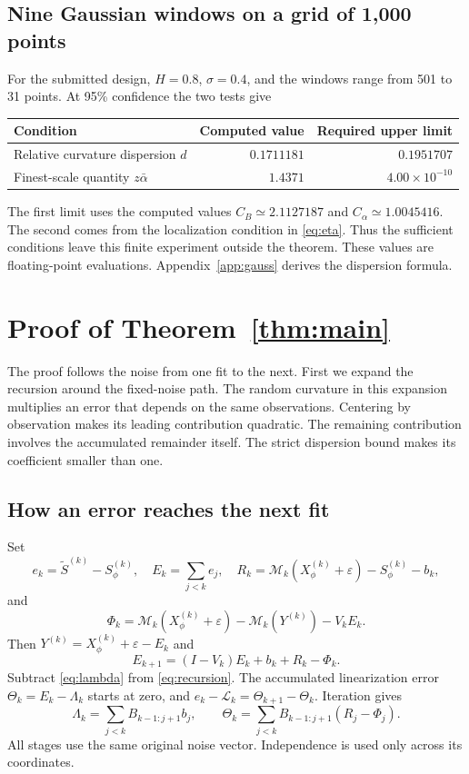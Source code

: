 \documentclass[11pt]{article}
\theoremstyle{remark}
\begin{document}
\subsection{Nine Gaussian windows on a grid of 1,000 points}
For the submitted design, \(H=0.8\), \(\sigma=0.4\), and the windows
range from 501 to 31 points. At 95\% confidence the two tests give
\begin{center}
\begin{tabular}{lrr}
\toprule
Condition & Computed value & Required upper limit\\
\midrule
Relative curvature dispersion \(d\) & \(0.1711181\) & \(0.1951707\)\\
Finest-scale quantity \(z\bar\alpha\) & \(1.4371\) & \(4.00\times10^{-10}\)\\
\bottomrule
\end{tabular}
\end{center}
The first limit uses the computed values \(C_B\simeq2.1127187\) and
\(C_\alpha\simeq1.0045416\). The second comes from the localization
condition in \eqref{eq:eta}. Thus the sufficient conditions leave this
finite experiment outside the theorem. These values are floating-point
evaluations. Appendix~\ref{app:gauss} derives the dispersion formula.
\clearpage
\section{Proof of Theorem~\ref{thm:main}}
The proof follows the noise from one fit to the next. First we expand
the recursion around the fixed-noise path. The random curvature in this
expansion multiplies an error that depends on the same observations.
Centering by observation makes its leading contribution quadratic.
The remaining contribution involves the accumulated remainder itself.
The strict dispersion bound makes its coefficient smaller than one.
\subsection{How an error reaches the next fit}
Set
\[
 e_k=\widetilde S^{(k)}-S_\phi^{(k)},\quad
 E_k=\sum_{j<k}e_j,\quad
 R_k=\mathcal M_k(X_\phi^{(k)}+\varepsilon)-S_\phi^{(k)}-b_k,
\]
and
\[
 \Phi_k=\mathcal M_k(X_\phi^{(k)}+\varepsilon)
              -\mathcal M_k(Y^{(k)})-V_kE_k.
\]
Then \(Y^{(k)}=X_\phi^{(k)}+\varepsilon-E_k\) and
\begin{equation}
 E_{k+1}=(I-V_k)E_k+b_k+R_k-\Phi_k. \label{eq:recursion}
\end{equation}
Subtract \eqref{eq:lambda} from \eqref{eq:recursion}. The accumulated
linearization error \(\Theta_k=E_k-\Lambda_k\) starts at zero, and
\(e_k-\mathcal L_k=\Theta_{k+1}-\Theta_k\). Iteration gives
\begin{equation}
 \Lambda_k=\sum_{j<k}B_{k-1:j+1}b_j,\qquad
 \Theta_k=\sum_{j<k}B_{k-1:j+1}(R_j-\Phi_j).
 \label{eq:unroll}
\end{equation}
All stages use the same original noise vector. Independence is used only
across its coordinates.
\end{document}
